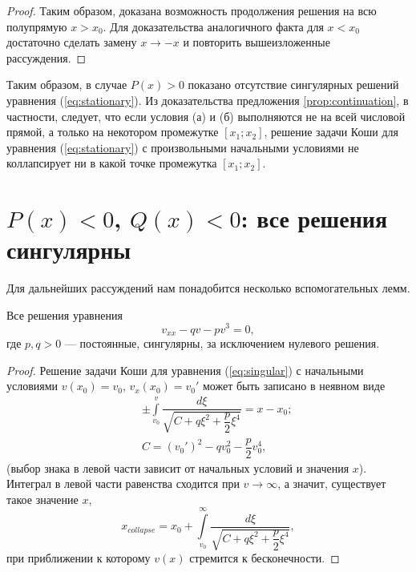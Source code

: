 \begin{proof}
Таким образом, доказана возможность продолжения решения на всю полупрямую $x > x_0$.
Для доказательства аналогичного факта для $x < x_0$ достаточно сделать замену $x \to -x$ и повторить вышеизложенные рассуждения.
\end{proof}

Таким образом, в случае $P(x) > 0$ показано отсутствие сингулярных решений уравнения (\ref{eq:stationary}).
Из доказательства предложения \ref{prop:continuation}, в частности, следует, что если условия (а) и (б) выполняются не на всей числовой прямой, а только на некотором промежутке $[x_1;x_2]$, решение задачи Коши для уравнения (\ref{eq:stationary}) с произвольными начальными условиями не коллапсирует ни в какой точке промежутка $[x_1;x_2]$.

\section{$P(x) < 0$, $Q(x) < 0$: все решения сингулярны}

Для дальнейших рассуждений нам понадобится несколько вспомогательных лемм.

\begin{lemma}
Все решения уравнения
%
\begin{equation}
v_{xx} - qv - pv^3 = 0,
\label{eq:singular}
\end{equation}
%
где $p,q > 0$ --- постоянные, сингулярны, за исключением нулевого решения.
\label{lemma:singular}
\end{lemma}
%
\begin{proof}
Решение задачи Коши для уравнения (\ref{eq:singular}) с начальными условиями $v(x_0) = v_0$, $v_x(x_0) = v_0'$ может быть записано в неявном виде
%
\begin{eqnarray}
&&\pm {\int \limits_{v_0}^{v} \dfrac{d\xi}{\sqrt{C + q{\xi}^2 + \dfrac{p}{2}{\xi}^4}}} = x - x_0; \\
&& \nonumber C = (v_0')^2 - qv_0^2 - \dfrac{p}{2}v_0^4,
\end{eqnarray}
%
(выбор знака в левой части зависит от начальных условий и значения $x$).
Интеграл в левой части равенства сходится при $v \to \infty$, а значит, существует такое значение $x$,
%
\begin{equation}
x_{collapse} = x_0 + {\int \limits_{v_0}^{\infty} \dfrac{d\xi}{\sqrt{C + q{\xi}^2 + \dfrac{p}{2}{\xi}^4}}},
\end{equation}
%
при приближении к которому $v(x)$ стремится к бесконечности.
\end{proof}

